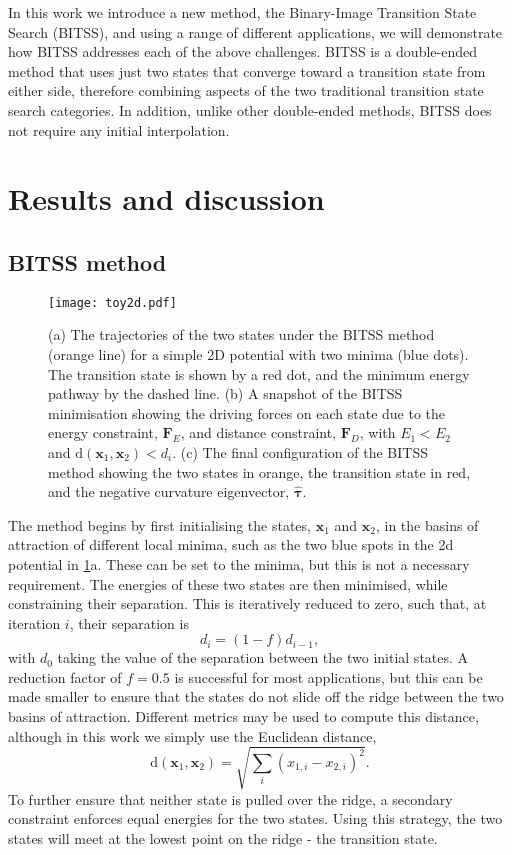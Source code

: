 \documentclass[twocolumn,10pt]{revtex4}
\begin{document}
In this work we introduce a new method, the Binary-Image Transition State Search (BITSS), and using a range of different applications, we will demonstrate how BITSS addresses each of the above challenges.
BITSS is a double-ended method that uses just two states that converge toward a transition state from either side, therefore combining aspects of the two traditional transition state search categories.
In addition, unlike other double-ended methods, BITSS does not require any initial interpolation.


\section{Results and discussion}
\subsection{BITSS method}
\begin{figure}[tb]
  \texttt{[image: toy2d.pdf]}
  \caption{\label{fig:toy2d}
    (a) The trajectories of the two states under the BITSS method (orange line) for a simple 2D potential with two minima (blue dots).
        The transition state is shown by a red dot, and the minimum energy pathway by the dashed line.
    (b) A snapshot of the BITSS minimisation showing the driving forces on each state due to the energy constraint, $\bm{F}_E$, and distance constraint, $\bm{F}_D$, with $E_1 < E_2$ and $\mathrm{d}(\bm{x}_1,\bm{x}_2) < d_i$.
    (c) The final configuration of the BITSS method showing the two states in orange, the transition state in red, and the negative curvature eigenvector, $\bm{\hat{\tau}}$.
  }
\end{figure}

The method begins by first initialising the states, $\bm{x}_1$ and $\bm{x}_2$, in the basins of attraction of different local minima, such as the two blue spots in the 2d potential in \cref{fig:toy2d}a.
These can be set to the minima, but this is not a necessary requirement.
The energies of these two states are then minimised, while constraining their separation.
This is iteratively reduced to zero, such that, at iteration $i$, their separation is
\begin{equation}\label{eq:diteration}
  d_i = (1 - f) d_{i-1},
\end{equation}
with $d_0$ taking the value of the separation between the two initial states.
A reduction factor of $f = 0.5$ is successful for most applications, but this can be made smaller to ensure that the states do not slide off the ridge between the two basins of attraction.
Different metrics may be used to compute this distance, although in this work we simply use the Euclidean distance,
\begin{equation}
  \mathrm{d}(\bm{x}_1, \bm{x}_2) = \sqrt{\sum_i (x_{1,i} - x_{2,i})^2}.
\end{equation}
To further ensure that neither state is pulled over the ridge, a secondary constraint enforces equal energies for the two states.
Using this strategy, the two states will meet at the lowest point on the ridge - the transition state.
\end{document}
